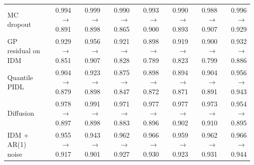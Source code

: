 \begin{table}[htbp]
\begin{tabular}{lrrrrrrr}
MC dropout & 0.994 $\rightarrow$ 0.891 & 0.999 $\rightarrow$ 0.898 & 0.990 $\rightarrow$ 0.865 & 0.993 $\rightarrow$ 0.900 & 0.990 $\rightarrow$ 0.893 & 0.988 $\rightarrow$ 0.907 & 0.996 $\rightarrow$ 0.929 \\
GP residual on IDM & 0.929 $\rightarrow$ 0.851 & 0.956 $\rightarrow$ 0.907 & 0.921 $\rightarrow$ 0.828 & 0.898 $\rightarrow$ 0.789 & 0.919 $\rightarrow$ 0.823 & 0.900 $\rightarrow$ 0.799 & 0.932 $\rightarrow$ 0.886 \\
Quantile PIDL & 0.904 $\rightarrow$ 0.879 & 0.923 $\rightarrow$ 0.898 & 0.875 $\rightarrow$ 0.847 & 0.898 $\rightarrow$ 0.872 & 0.894 $\rightarrow$ 0.871 & 0.904 $\rightarrow$ 0.891 & 0.956 $\rightarrow$ 0.943 \\
Diffusion & 0.978 $\rightarrow$ 0.897 & 0.991 $\rightarrow$ 0.898 & 0.971 $\rightarrow$ 0.883 & 0.977 $\rightarrow$ 0.896 & 0.977 $\rightarrow$ 0.902 & 0.973 $\rightarrow$ 0.910 & 0.954 $\rightarrow$ 0.895 \\
IDM + AR(1) noise & 0.955 $\rightarrow$ 0.917 & 0.943 $\rightarrow$ 0.901 & 0.962 $\rightarrow$ 0.927 & 0.966 $\rightarrow$ 0.930 & 0.959 $\rightarrow$ 0.923 & 0.962 $\rightarrow$ 0.931 & 0.966 $\rightarrow$ 0.944 \\
\bottomrule
\end{tabular}
\end{table}
